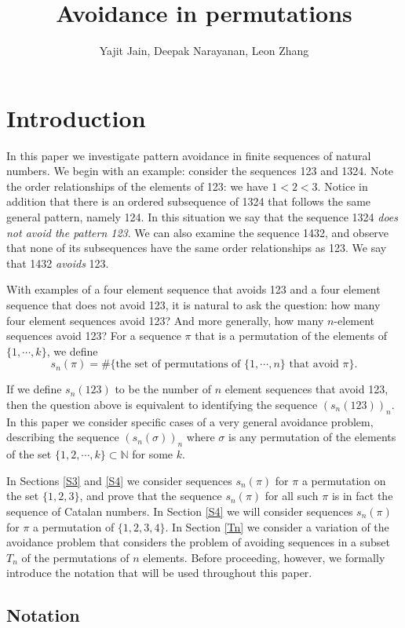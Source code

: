 \documentclass[11pt,letterpaper,twoside,english]{article}
\title{Avoidance in permutations}
\author{Yajit Jain, Deepak Narayanan, Leon Zhang}
\theoremstyle{theorem}
\theoremstyle{remark}
\begin{document}
\maketitle

\section{Introduction}
In this paper we investigate pattern avoidance in finite sequences of natural numbers. We begin with an example: consider the sequences 123 and 1324. Note the order relationships of the elements of 123: we have $1< 2 < 3$. Notice in addition that there is an ordered subsequence of 1324 that follows the same general pattern, namely 124. In this situation we say that the sequence 1324 \emph{does not avoid the pattern 123}. We can also examine the sequence 1432, and observe that none of its subsequences have the same order relationships as 123. We say that 1432 \emph{avoids} 123.

With examples of a four element sequence that avoids 123 and a four element sequence that does not avoid 123, it is natural to ask the question: how many four element sequences avoid 123? And more generally, how many $n$-element sequences avoid 123? For a sequence $\pi$ that is a permutation of the elements of $\{1,\cdots,k\}$, we define
$$
s_n(\pi)=\#\{\text{the set of permutations of $\{1,\cdots, n\}$ that avoid $\pi$}\}.
$$


If we define $s_n(123)$ to be the number of $n$ element sequences that avoid 123, then the question above is equivalent to identifying the sequence $(s_n(123))_n$. In this paper we consider specific cases of a very general avoidance problem, describing the sequence $(s_n(\sigma))_n$ where $\sigma$ is any permutation of the elements of the set $\{1,2,\cdots, k\}\subset\mathbb{N}$ for some $k$.

In Sections \ref{S3} and \ref{S4} we consider sequences $s_n(\pi)$ for $\pi$ a permutation on the set $\{1,2,3\}$, and prove that the sequence $s_n(\pi)$ for all such $\pi$ is in fact the sequence of Catalan numbers. In Section \ref{S4} we will consider sequences $s_n(\pi)$ for $\pi$ a permutation of $\{1,2,3,4\}$. In Section \ref{Tn} we consider a variation of the avoidance problem that considers the problem of avoiding sequences in a subset $T_n$ of the permutations of $n$ elements. Before proceeding, however, we formally introduce the notation that will be used throughout this paper. 


\subsection{Notation}
\end{document}
